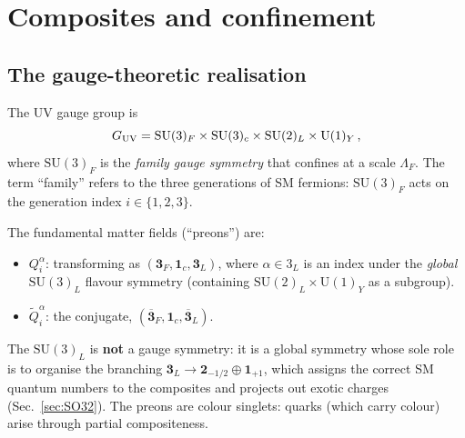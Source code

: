 \documentclass[aps,prd,twocolumn,showpacs,preprintnumbers,superscriptaddress,floatfix]{revtex4-2}
\newcommand{\SU}{\mathrm{SU}}
\newcommand{\UU}{\mathrm{U}}
\begin{document}
\section{Composites and confinement}
\label{sec:composites}

\subsection{The gauge-theoretic realisation}

The UV gauge group is
\begin{equation}
  G_{\rm UV} = \SU(3)_F \times \SU(3)_c \times \SU(2)_L
  \times \UU(1)_Y\,,
  \label{eq:GUV}
\end{equation}
where $\SU(3)_F$ is the \emph{family gauge symmetry} that
confines at a scale $\Lambda_F$.
The term ``family'' refers to the three generations of SM
fermions: $\SU(3)_F$ acts on the generation index
$i \in \{1, 2, 3\}$.

The fundamental matter fields (``preons'') are:
\begin{itemize}
  \item $Q^\alpha_i$: transforming as
    $(\mathbf{3}_F, \mathbf{1}_c, \mathbf{3}_L)$,
    where $\alpha \in 3_L$ is an index under the
    \emph{global} $\SU(3)_L$ flavour symmetry
    (containing $\SU(2)_L \times \UU(1)_Y$ as a subgroup).
  \item $\tilde{Q}_i^\alpha$: the conjugate,
    $(\overline{\mathbf{3}}_F, \mathbf{1}_c,
    \overline{\mathbf{3}}_L)$.
\end{itemize}
The $\SU(3)_L$ is \textbf{not} a gauge symmetry: it is a global
symmetry whose sole role is to organise the branching
$\mathbf{3}_L \to \mathbf{2}_{-1/2} \oplus \mathbf{1}_{+1}$,
which assigns the correct SM quantum numbers to the composites
and projects out exotic charges
(Sec.~\ref{sec:SO32}).
The preons are colour singlets: quarks (which carry colour) arise
through partial compositeness.
\end{document}
